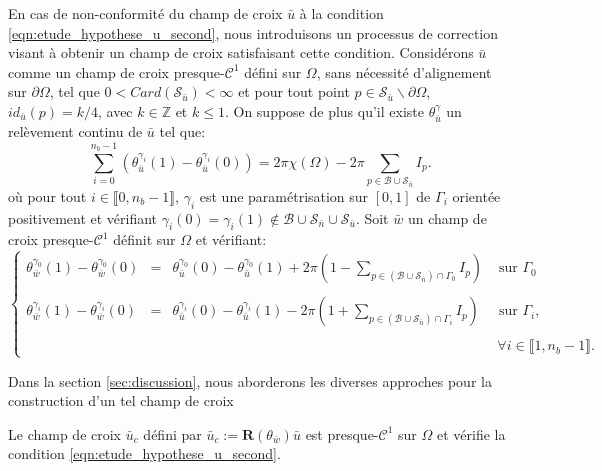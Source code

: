 En cas de non-conformité du champ de croix $\bar{u}$ à la condition \eqref{eqn:etude_hypothese_u_second}, nous introduisons un processus de correction visant à obtenir un champ de croix satisfaisant cette condition. Considérons $\bar{u}$ comme un champ de croix presque-$\mathcal{C}^1$ défini sur $\Omega$, sans nécessité d'alignement sur $\partial\Omega$, tel que $0<Card(\mathcal{S}_{\bar{u}})<\infty$ et pour tout point $p\in\mathcal{S}_{\bar{u}}\backslash\partial\Omega$, $id_{\bar{u}}(p)=k/4$, avec $k\in\mathbb{Z}$ et $k\leq 1$. On suppose de plus qu'il existe $\theta_{\bar{u}}^\gamma$ un relèvement continu de $\bar{u}$ tel que:
\begin{equation}
    \displaystyle\sum_{i=0}^{n_b-1}\left(\theta_{\bar{u}}^{\gamma_i}(1)-\theta_{\bar{u}}^{\gamma_i}(0)\right)=2\pi\chi(\Omega)-2\pi\sum_{p\in\mathcal{B}\cup\mathcal{S}_{\bar{n}}}I_p.
\end{equation}
où pour tout $i\in\llbracket0, n_b-1\rrbracket$, $\gamma_i$ est une paramétrisation sur $[0, 1]$ de $\Gamma_i$ orientée positivement et vérifiant $\gamma_i(0)=\gamma_i(1)\notin\mathcal{B}\cup\mathcal{S}_{\bar{n}}\cup\mathcal{S}_{\bar{u}}$.
Soit $\bar{w}$ un champ de croix presque-$\mathcal{C}^1$ définit sur $\Omega$ et vérifiant:
\begin{equation}
    \left\{
    \begin{array}{lcll}
    \theta_{\bar{w}}^{\gamma_0}(1)-\theta_{\bar{w}}^{\gamma_0}(0)&=&\theta_{\bar{u}}^{\gamma_0}(0)-\theta_{\bar{u}}^{\gamma_0}(1)+2\pi\left(1-\displaystyle\sum_{p\in(\mathcal{B}\cup\mathcal{S}_{\bar{n}})\cap\Gamma_0}I_p\right)&\mbox{ sur }\Gamma_0\\\\
    \theta_{\bar{w}}^{\gamma_i}(1)-\theta_{\bar{w}}^{\gamma_i}(0)&=&\theta_{\bar{u}}^{\gamma_i}(0)-\theta_{\bar{u}}^{\gamma_i}(1)-2\pi\left(1+\displaystyle\sum_{p\in(\mathcal{B}\cup\mathcal{S}_{\bar{n}})\cap\Gamma_i}I_p\right)&\mbox{ sur }\Gamma_i,\\\\
    &&&~\forall i\in\llbracket 1, n_b-1\rrbracket.
    \end{array}
    \right.
    \label{eqn:etude_hypothese_w}
\end{equation}

Dans la section \ref{sec:discussion}, nous aborderons les diverses approches pour la construction d'un tel champ de croix

\begin{proposition}
    Le champ de croix $\bar{u}_c$ défini par $\bar{u}_c:=\mathbf{R}(\theta_{\bar{w}})\bar{u}$ est presque-$\mathcal{C}^1$ sur $\Omega$ et vérifie la condition \eqref{eqn:etude_hypothese_u_second}.
\end{proposition}

